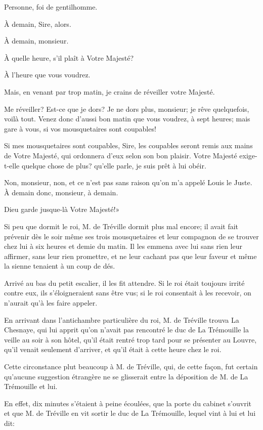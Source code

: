 \speak  Personne, foi de gentilhomme. 

\speak  À demain, Sire, alors. 

\speak  À demain, monsieur. 

\speak  À quelle heure, s'il plaît à Votre Majesté? 

\speak  À l'heure que vous voudrez. 

\speak  Mais, en venant par trop matin, je crains de réveiller votre Majesté. 

\speak  Me réveiller? Est-ce que je dors? Je ne dors plus, monsieur; je rêve quelquefois, voilà tout. Venez donc d'aussi bon matin que vous voudrez, à sept heures; mais gare à vous, si vos mousquetaires sont coupables! 

\speak  Si mes mousquetaires sont coupables, Sire, les coupables seront remis aux mains de Votre Majesté, qui ordonnera d'eux selon son bon plaisir. Votre Majesté exige-t-elle quelque chose de plus? qu'elle parle, je suis prêt à lui obéir. 

\speak  Non, monsieur, non, et ce n'est pas sans raison qu'on m'a appelé Louis le Juste. À demain donc, monsieur, à demain. 

\speak  Dieu garde jusque-là Votre Majesté!» 

Si peu que dormit le roi, M. de Tréville dormit plus mal encore; il avait fait prévenir dès le soir même ses trois mousquetaires et leur compagnon de se trouver chez lui à six heures et demie du matin. Il les emmena avec lui sans rien leur affirmer, sans leur rien promettre, et ne leur cachant pas que leur faveur et même la sienne tenaient à un coup de dés. 

Arrivé au bas du petit escalier, il les fit attendre. Si le roi était toujours irrité contre eux, ils s'éloigneraient sans être vus; si le roi consentait à les recevoir, on n'aurait qu'à les faire appeler. 

En arrivant dans l'antichambre particulière du roi, M. de Tréville trouva La Chesnaye, qui lui apprit qu'on n'avait pas rencontré le duc de La Trémouille la veille au soir à son hôtel, qu'il était rentré trop tard pour se présenter au Louvre, qu'il venait seulement d'arriver, et qu'il était à cette heure chez le roi. 

Cette circonstance plut beaucoup à M. de Tréville, qui, de cette façon, fut certain qu'aucune suggestion étrangère ne se glisserait entre la déposition de M. de La Trémouille et lui. 

En effet, dix minutes s'étaient à peine écoulées, que la porte du cabinet s'ouvrit et que M. de Tréville en vit sortir le duc de La Trémouille, lequel vint à lui et lui dit: 


